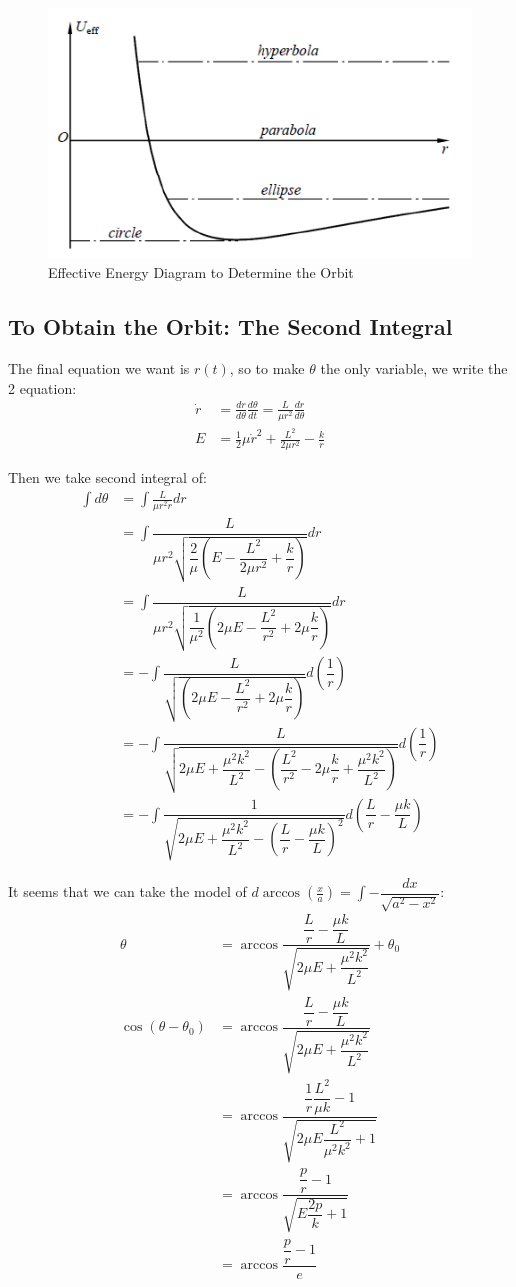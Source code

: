 \documentclass[11pt, a4paper, oneside]{book}
\numberwithin{equation}{section}%
\begin{document}
	\begin{figure}[H]
		\centering
		\includegraphics[width=0.3\linewidth]{"Effective Potential Energy"}
		\caption{Effective Energy Diagram to Determine the Orbit}
		\label{fig:effective-potential-energy}
	\end{figure}
	
\subsection{To Obtain the Orbit: The Second Integral}

The final equation we want is $r(t)$, so to make $\theta$ the only variable, we write the 2 equation:
\begin{align}
	\dot{r} &= \frac{dr}{d\theta}\frac{d\theta}{dt} = \frac{L}{\mu r^2} \frac{dr}{d\theta}\\
	E &= \frac{1}{2}\mu\dot{r}^2 + \frac{L^2}{2\mu r^2} - \frac{k}{r}
\end{align}

Then we take second integral of:
\begin{align}
	\int d\theta &= \int \frac{L}{\mu r^2 \dot{r}}dr\\
	&= \int \dfrac{L}{\mu r^2 \sqrt{\dfrac{2}{\mu}\left(E - \dfrac{L^2}{2\mu r^2} + \dfrac{k}{r}\right)}}dr\\
	&= \int \dfrac{L}{\mu r^2 \sqrt{\dfrac{1}{\mu^2}\left(2\mu E - \dfrac{L^2}{r^2} + 2\mu\dfrac{k}{r}\right)}}dr\\
	&= -\int \dfrac{L}{\sqrt{\left(2\mu E - \dfrac{L^2}{r^2} + 2\mu\dfrac{k}{r}\right)}}d\left(\dfrac{1}{r}\right)\\
	&= -\int \dfrac{L}{\sqrt{2\mu E + \dfrac{\mu^2 k^2}{L^2}-\left( \dfrac{L^2}{r^2} - 2\mu\dfrac{k}{r} + \dfrac{\mu^2 k^2}{L^2} \right)}} d\left(\dfrac{1}{r}\right)\\
	&= -\int \dfrac{1}{\sqrt{2\mu E + \dfrac{\mu^2 k^2}{L^2}-\left(\dfrac{L}{r} - \dfrac{\mu k}{L}\right)^2}} d\left(\dfrac{L}{r} - \dfrac{\mu k}{L}\right)
\end{align}

It seems that we can take the model of $\displaystyle{d\arccos\left(\frac{x}{a}\right) = \int -\dfrac{dx}{\sqrt{a^2 - x^2}}}$:
\begin{align}
\theta &= \arccos\dfrac{\dfrac{L}{r} - \dfrac{\mu k}{L}}{\sqrt{2\mu E + \dfrac{\mu^2 k^2}{L^2}}} + \theta_0\\
\cos(\theta - \theta_0) &= \arccos\dfrac{\dfrac{L}{r} - \dfrac{\mu k}{L}}{\sqrt{2\mu E + \dfrac{\mu^2 k^2}{L^2}}}\\
&= \arccos\dfrac{\dfrac{1}{r}\dfrac{L^2}{\mu k} - 1}{\sqrt{2\mu E\dfrac{L^2}{\mu^2 k^2} + 1}}\\
&= \arccos\dfrac{\dfrac{p}{r} - 1}{\sqrt{E\dfrac{2p}{k} + 1}}\\
&= \arccos\dfrac{\dfrac{p}{r} - 1}{e}\\
\end{align}	
\end{document}
